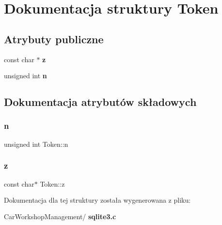 \section{Dokumentacja struktury Token}
\label{struct_token}
\subsection*{Atrybuty publiczne}
\begin{DoxyCompactItemize}
\item 
const char $\ast$ \textbf{ z}
\item 
unsigned int \textbf{ n}
\end{DoxyCompactItemize}


\subsection{Dokumentacja atrybutów składowych}
\mbox{\label{struct_token_ad8442439e00ab9713a9b91a53e44c2aa}} 
\subsubsection{n}
{\footnotesize\ttfamily unsigned int Token\+::n}

\mbox{\label{struct_token_a57b502141e3018e4a02773424acb4ffd}} 
\subsubsection{z}
{\footnotesize\ttfamily const char$\ast$ Token\+::z}



Dokumentacja dla tej struktury została wygenerowana z pliku\+:\begin{DoxyCompactItemize}
\item 
Car\+Workshop\+Management/\textbf{ sqlite3.\+c}\end{DoxyCompactItemize}
